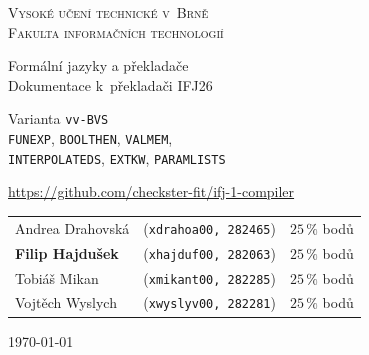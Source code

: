 \documentclass[a4paper, 11pt]{article}
\begin{document}
    \begin{titlepage}

        \centering

        \textsc {
            {\Huge Vysoké učení technické v~Brně \\[0.5em]}
            {\huge Fakulta informačních technologií}
        }\\


        {
            \Huge Formální jazyky a překladače \\ \vspace{0.4em}
            \huge Dokumentace k~překladači IFJ26 \\ \vspace{0.4em}

            \vspace{2em}
            \huge
                Varianta \texttt{vv-BVS}  \\
            \vspace{0.4em}
            \Large
                \texttt{FUNEXP},
                \texttt{BOOLTHEN},
                \texttt{VALMEM}, \\
                \texttt{INTERPOLATEDS},
                \texttt{EXTKW},
                \texttt{PARAMLISTS} \\
            \vspace{3em}

        }

        {
            \Large

            \url{https://github.com/checkster-fit/ifj-1-compiler} \\

            \vspace{1em}

            \begin{tabular}{l l r}
                Andrea Drahovská & (\texttt{xdrahoa00, 282465}) & $25\,\%$ bodů \\
                \textbf{Filip Hajdušek} & (\texttt{xhajduf00, 282063}) & $25\,\%$ bodů \\
                Tobiáš Mikan & (\texttt{xmikant00, 282285}) & $25\,\%$ bodů \\
                Vojtěch Wyslych & (\texttt{xwyslyv00, 282281}) & $25\,\%$ bodů \\
            \end{tabular}

            \vspace{1em}
            \today
        }

        \setcounter{page}{0}
        \setcounter{table}{-1}


    \end{titlepage}
\end{document}
